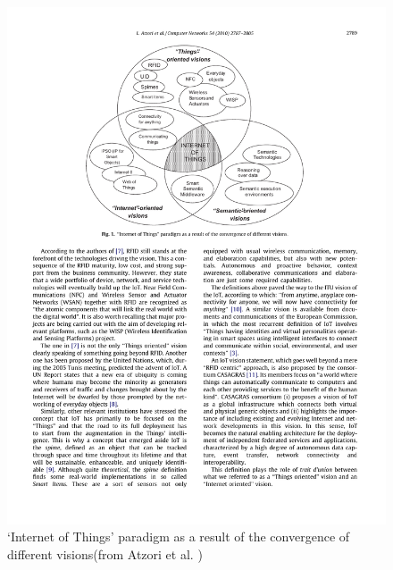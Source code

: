 	\begin{figure}[ht]
	    \begin{center}
	    \includegraphics[scale=0.35]{Talk11/iot_visions.pdf}
	    \end{center}
	    \caption{`Internet of Things' paradigm as a result of the convergence of different visions(from Atzori et al. \cite{atzori})}
	    \label{fig:iot_visions}
    \end{figure}

